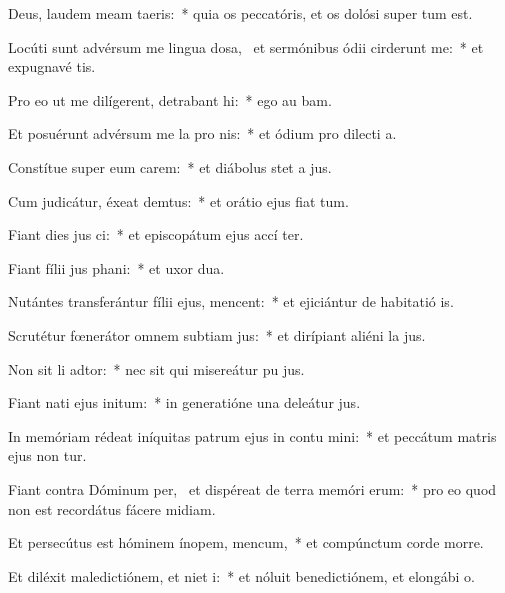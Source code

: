 \item Deus, laudem meam  taeris:~* quia os peccatóris, et os dolósi super  tum est.
\item Locúti sunt advérsum me lingua dosa,~\pscross{} et sermónibus ódii cirderunt me:~* et expugnavé  tis.
\item Pro eo ut me dilígerent, detrabant hi:~* ego au bam.
\item Et posuérunt advérsum me la pro nis:~* et ódium pro dilecti a.
\item Constítue super eum carem:~* et diábolus stet a  jus.
\item Cum judicátur, éxeat demtus:~* et orátio ejus fiat  tum.
\item Fiant dies jus ci:~* et episcopátum ejus accí ter.
\item Fiant fílii jus phani:~* et uxor  dua.
\item Nutántes transferántur fílii ejus,  mencent:~* et ejiciántur de habitatió is.
\item Scrutétur fœnerátor omnem subtiam jus:~* et dirípiant aliéni la jus.
\item Non sit li adtor:~* nec sit qui misereátur pu jus.
\item Fiant nati ejus  initum:~* in generatióne una deleátur  jus.
\item In memóriam rédeat iníquitas patrum ejus in contu mini:~* et peccátum matris ejus non tur.
\item Fiant contra Dóminum per,~\pscross{} et dispéreat de terra memóri erum:~* pro eo quod non est recordátus fácere midiam.
\item Et persecútus est hóminem ínopem,  mencum,~* et compúnctum corde morre.
\item Et diléxit maledictiónem, et niet i:~* et nóluit benedictiónem, et elongábi  o.
